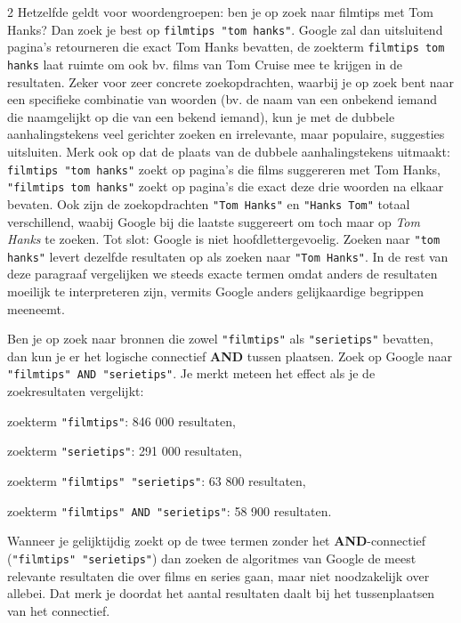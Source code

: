 \begin{multicols}{2}
Hetzelfde geldt voor woordengroepen: ben je op zoek naar filmtips met Tom Hanks? Dan zoek je best op \verb|filmtips "tom hanks"|. Google zal dan uitsluitend pagina's retourneren die exact Tom Hanks bevatten, de zoekterm \verb|filmtips tom hanks| laat ruimte om ook bv. films van Tom Cruise mee te krijgen in de resultaten. Zeker voor zeer concrete zoekopdrachten, waarbij je op zoek bent naar een specifieke combinatie van woorden (bv. de naam van een onbekend iemand die naamgelijkt op die van een bekend iemand), kun je met de dubbele aanhalingstekens veel gerichter zoeken en irrelevante, maar populaire, suggesties uitsluiten. Merk ook op dat de plaats van de dubbele aanhalingstekens uitmaakt: \verb|filmtips "tom hanks"| zoekt op pagina's die films suggereren met Tom Hanks, \verb|"filmtips tom hanks"| zoekt op pagina's die exact deze drie woorden na elkaar bevaten. Ook zijn de zoekopdrachten \verb|"Tom Hanks"| en \verb|"Hanks Tom"| totaal verschillend, waabij Google bij die laatste suggereert om toch maar op \textit{Tom Hanks} te zoeken. Tot slot: Google is niet hoofdlettergevoelig. Zoeken naar \verb|"tom hanks"| levert dezelfde resultaten op als zoeken naar \verb|"Tom Hanks"|. In de rest van deze paragraaf vergelijken we steeds exacte termen omdat anders de resultaten moeilijk te interpreteren zijn, vermits Google anders gelijkaardige begrippen meeneemt.


Ben je op zoek naar bronnen die zowel \verb|"filmtips"| als \verb|"serietips"| bevatten, dan kun je er het logische connectief \textbf{AND} tussen plaatsen. Zoek op Google naar \verb|"filmtips" AND "serietips"|. Je merkt meteen het effect als je de zoekresultaten vergelijkt:
\begin{opsomming}
	\item zoekterm \verb|"filmtips"|: 846 000 resultaten,
	\item zoekterm \verb|"serietips"|: 291 000 resultaten,
	\item zoekterm \verb|"filmtips" "serietips"|: 63 800 resultaten,
	\item zoekterm \verb|"filmtips" AND "serietips"|: 58 900 resultaten.

\end{opsomming}
Wanneer je gelijktijdig zoekt op de twee termen zonder het \textbf{AND}-connectief (\verb|"filmtips" "serietips"|) dan zoeken de algoritmes van Google de meest relevante resultaten die over films en series gaan, maar niet noodzakelijk over allebei. Dat merk je doordat het aantal resultaten daalt bij het tussenplaatsen van het connectief.


\end{multicols}
